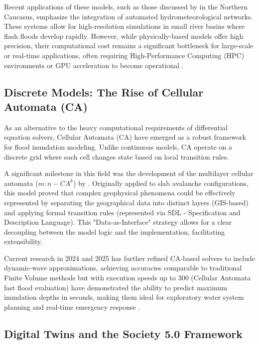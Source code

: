 Recent applications of these models, such as those discussed by \cite{Vasileva2021} in the Northern Caucasus, 
emphasize the integration of automated hydrometeorological networks. These systems allow for high-resolution simulations 
in small river basins where flash floods develop rapidly. However, while physically-based models offer high precision, 
their computational cost remains a significant bottleneck for large-scale or real-time applications, often requiring 
High-Performance Computing (HPC) environments or GPU acceleration to become operational \parencite{Aleksyuk2017}.


\subsection{Discrete Models: The Rise of Cellular Automata (CA)}

As an alternative to the heavy computational requirements of differential equation solvers, Cellular Automata (CA) have 
emerged as a robust framework for flood inundation modeling. Unlike continuous models, CA operate on a discrete grid 
where each cell changes state based on local transition rules.

A significant milestone in this field was the development of the multilayer cellular automata ($m:n-CA^k$) by \cite{Fonseca2011}. 
Originally applied to slab avalanche configurations, this model proved that complex geophysical phenomena 
could be effectively represented by separating the geographical data into distinct layers (GIS-based) and applying formal 
transition rules (represented via SDL - Specification and Description Language). This "Data-as-Interface" strategy allows 
for a clear decoupling between the model logic and the implementation, facilitating extensibility.

Current research in 2024 and 2025 has further refined CA-based solvers to include dynamic-wave approximations, achieving 
accuracies comparable to traditional Finite Volume methods but with execution speeds up to 300%
(Cellular Automata fast flood evaluation) have demonstrated the ability to predict maximum inundation depths in seconds, making 
them ideal for exploratory water system planning and real-time emergency response \parencite{Jamali2019}.


\subsection{Digital Twins and the Society 5.0 Framework}

